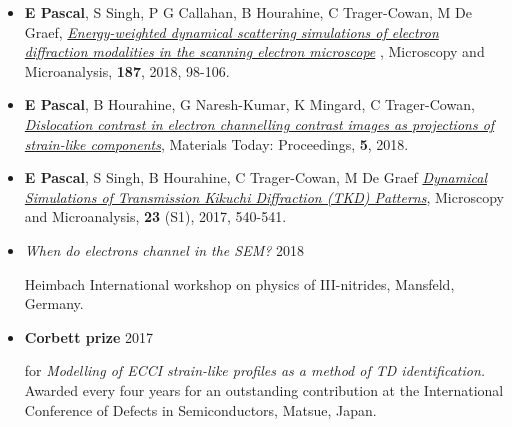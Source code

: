 \documentclass[
11pt, %
oneside, %
english, %
onehalfspacing, %
headsepline, %
chapterinoneline, %
]{MastersDoctoralThesis} %
\begin{document}
\begin{contributions}

\vspace{0.3cm}
\begin{itemize}
    \item \textbf{E Pascal}, S Singh, P  G Callahan, B Hourahine, C Trager-Cowan, M De Graef, \href{https://doi.org/10.1016/j.ultramic.2018.01.003}{\textit{Energy-weighted dynamical scattering simulations of electron diffraction modalities in the scanning electron microscope}} , Microscopy and Microanalysis,  \textbf{187}, 2018, 98-106.

    
    \item \textbf{E Pascal}, B Hourahine, G Naresh-Kumar, K Mingard, C Trager-Cowan, \href{https://doi.org/10.1016/j.matpr.2018.03.057}{\textit{Dislocation contrast in electron channelling contrast images as projections of strain-like components}}, Materials Today: Proceedings, \textbf{5}, 2018.
    
    \item \textbf{E Pascal}, S Singh, B Hourahine, C Trager-Cowan, M De Graef \href{https://www.cambridge.org/core/journals/microscopy-and-microanalysis/article/dynamical-simulations-of-transmission-kikuchi-diffraction-tkd-patterns/1863E684CEDF207910A5BFE58D7DE902/share/e286c71a1d759f81d3417ebf6cb4e78b8d81fcd2}{\textit{Dynamical Simulations of Transmission Kikuchi Diffraction (TKD) Patterns}}, Microscopy and Microanalysis, \textbf{23} (S1), 2017, 540-541.
\end{itemize}

\vspace{0.3cm}

\begin{itemize}
    \item \begin{flushleft}\textit{When do electrons channel in the SEM?}  \hfill{} 2018  \end{flushleft}
    Heimbach International workshop on physics of III-nitrides, Mansfeld, Germany.
\end{itemize}

\vspace{0.3cm}
\begin{itemize}
\item \begin{flushleft}\textbf{ Corbett prize } \hfill{} 2017  \end{flushleft}
for \textit{Modelling of ECCI strain-like profiles as a method of TD identification.}\\
    Awarded every four years for an outstanding contribution at the International Conference of Defects in Semiconductors, Matsue, Japan.


\end{itemize}
\end{contributions}
\end{document}
